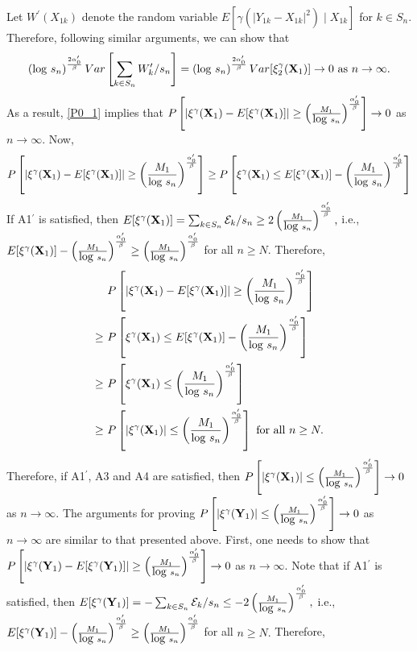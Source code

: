 \documentclass[twoside]{article}
\def\log{\hbox{log}}
\newcommand{\bX}{\mathbf{X}}
\newcommand{\bY}{\mathbf{Y}}
\newcommand{\0}{\mathbf{0}}
\newcommand{\1}{\mathbf{1}}
\numberwithin{equation}{section}
\begin{document}
\noindent Let $W^\prime(X_{1k})$ denote the random variable $E[\gamma(|Y_{1k}-X_{1k}|^2)\mid X_{1k}]$ for $k\in S_n.$ Therefore, following similar arguments, we can show that $$\left (\log\ s_n\right )^\frac{2\alpha^\prime_0}{\beta}Var\left [\sum_{k\in S_n}W^\prime_{k}/s_n\right ] = \left (\log\ s_n\right )^\frac{2\alpha^\prime_0}{\beta}Var[\xi_2^\gamma(\bX_1)]\to 0\text{ as }n\to\infty.$$ As a result, \ref{P0_1} implies that $P\left [|\xi^\gamma(\bX_1)-E[\xi^\gamma(\bX_1)]|\geq \left (\frac{M_1}{\log\ s_n}\right )^\frac{\alpha^\prime_0}{\beta}\right ]\to 0$ as $n\to\infty.$ Now,
\begin{align*}
P\left [|\xi^\gamma(\bX_1)-E[\xi^\gamma(\bX_1)]|\geq \left (\frac{M_1}{\log\ s_n}\right )^\frac{\alpha^\prime_0}{\beta}\right ]\geq  P\left [\xi^\gamma(\bX_1)\leq E[\xi^\gamma(\bX_1)]-\left (\frac{M_1}{\log\ s_n}\right )^\frac{\alpha^\prime_0}{\beta}\right ]
\end{align*}
If A1$^\prime$ is satisfied, then $E[\xi^\gamma(\bX_1)]=\sum_{k\in S_n}\mathcal{E}_k/s_n\geq 2\left (\frac{M_1}{\log\ s_n}\right )^\frac{\alpha^\prime_0}{\beta},$ i.e., $E[\xi^\gamma(\bX_1)]-\left (\frac{M_1}{\log\ s_n}\right )^\frac{\alpha^\prime_0}{\beta}\geq \left (\frac{M_1}{\log\ s_n}\right )^\frac{\alpha^\prime_0}{\beta}$ for all $n\geq N.$ Therefore,
\begin{align*}
&\ P\left [|\xi^\gamma(\bX_1)-E[\xi^\gamma(\bX_1)]|\geq \left (\frac{M_1}{\log\ s_n}\right )^\frac{\alpha^\prime_0}{\beta}\right ]\\
\geq &\  P\left [\xi^\gamma(\bX_1)\leq E[\xi^\gamma(\bX_1)]-\left (\frac{M_1}{\log\ s_n}\right )^\frac{\alpha^\prime_0}{\beta}\right ]\\
\geq &\  P\left [\xi^\gamma(\bX_1)\leq \left (\frac{M_1}{\log\ s_n}\right )^\frac{\alpha^\prime_0}{\beta}\right ]\\
\geq &\  P\left [|\xi^\gamma(\bX_1)|\leq \left (\frac{M_1}{\log\ s_n}\right )^\frac{\alpha^\prime_0}{\beta}\right ]\text{ for all }n\geq N.
\end{align*}
Therefore, if A1$^\prime$, A3 and A4 are satisfied, then $P\left [|\xi^\gamma(\bX_1)|\leq \left (\frac{M_1}{\log\ s_n}\right )^\frac{\alpha^\prime_0}{\beta}\right ]\to 0 $ as $n\to\infty.$ The arguments for proving $P\left [|\xi^\gamma(\bY_1)|\leq \left (\frac{M_1}{\log\ s_n}\right )^\frac{\alpha^\prime_0}{\beta}\right ]\to 0 $ as $n\to\infty$ are similar to that presented above. First, one needs to show that $P\left [|\xi^\gamma(\bY_1)-E[\xi^\gamma(\bY_1)]|\geq \left (\frac{M_1}{\log\ s_n}\right )^\frac{\alpha^\prime_0}{\beta}\right ]\to 0$ as $n\to\infty.$ Note that if A1$^\prime$ is satisfied, then $E[\xi^\gamma(\bY_1)]=-\sum_{k\in S_n}\mathcal{E}_k/s_n\leq -2\left (\frac{M_1}{\log\ s_n}\right )^\frac{\alpha^\prime_0}{\beta},$ i.e., $E[\xi^\gamma(\bY_1)]-\left (\frac{M_1}{\log\ s_n}\right )^\frac{\alpha^\prime_0}{\beta}\geq \left (\frac{M_1}{\log\ s_n}\right )^\frac{\alpha^\prime_0}{\beta}$ for all $n\geq N.$ Therefore,
\end{document}
